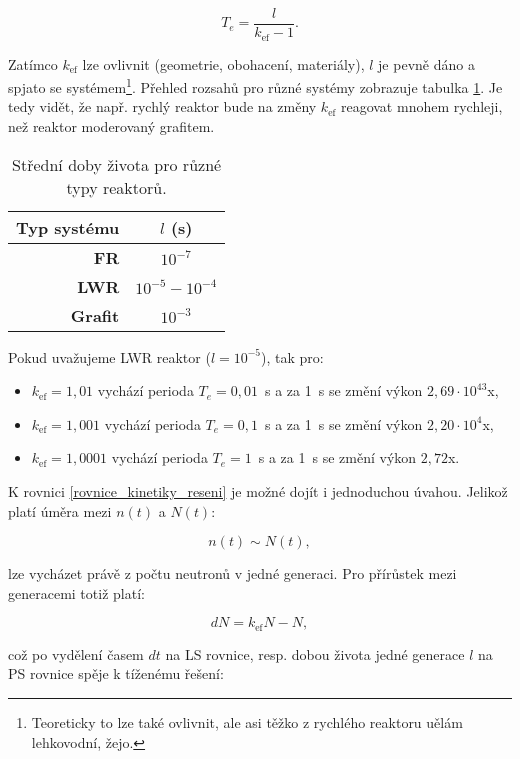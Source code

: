 \begin{equation}
  T_e = \dfrac{l}{k_{\text{ef}} - 1}.
  \label{perioda}
\end{equation}

Zatímco $k_{\text{ef}}$ lze ovlivnit (geometrie, obohacení, materiály), $l$ je pevně dáno a spjato se systémem\footnote{Teoreticky to lze také ovlivnit, ale asi těžko z rychlého reaktoru uělám lehkovodní, žejo.}. Přehled rozsahů pro různé systémy zobrazuje tabulka \ref{table_stredni_doby_zivota}. Je tedy vidět, že např. rychlý reaktor bude na změny $k_{\text{ef}}$ reagovat mnohem rychleji, než reaktor moderovaný grafitem.\\

\begin{table}[h]
\centering
\caption{Střední doby života pro různé typy reaktorů.}
\label{table_stredni_doby_zivota}
\begin{tabular}{@{}rc@{}}
\toprule
\textbf{Typ systému} & $l$ (s)              \\ \midrule
\textbf{FR}          & $10^{-7}$            \\
\textbf{LWR}         & $10^{-5} - 10^{-4}$  \\
\textbf{Grafit}      & $10^{-3}$            \\ \bottomrule
\end{tabular}
\end{table}

Pokud uvažujeme LWR reaktor ($l = 10^{-5}$), tak pro:

\begin{itemize}
  \item $k_{\text{ef}} = 1,01$ vychází perioda $T_e = 0,01$~s a za 1~s se změní výkon $2,69 \cdot 10^{43}$x,
  \item $k_{\text{ef}} = 1,001$ vychází perioda $T_e = 0,1$~s a za 1~s se změní výkon $2,20 \cdot 10^{4}$x,
  \item $k_{\text{ef}} = 1,0001$ vychází perioda $T_e = 1$~s a za 1~s se změní výkon $2,72$x.
\end{itemize}

K rovnici \eqref{rovnice_kinetiky_reseni} je možné dojít i jednoduchou úvahou. Jelikož platí úměra mezi $n(t)$ a $N(t)$:

$$ n(t) \sim N(t), $$

lze vycházet právě z počtu neutronů v jedné generaci. Pro přírůstek mezi generacemi totiž platí:

$$ dN = k_{\text{ef}}N - N, $$

což po vydělení časem $dt$ na LS rovnice, resp. dobou života jedné generace $l$ na PS rovnice spěje k tíženému řešení:

